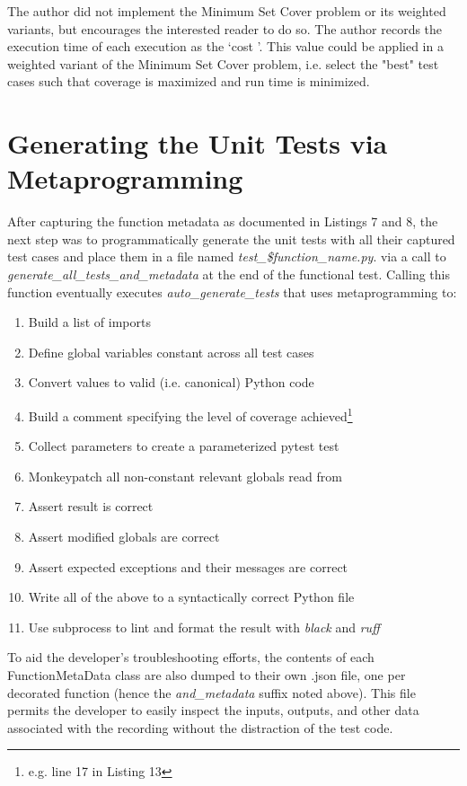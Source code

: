 The author did not implement 
the Minimum Set Cover problem or its weighted variants, but encourages 
the interested reader to do so.  The author records the execution time of each 
execution as the \lq cost \rq. This value could be applied in a weighted 
variant of the Minimum Set Cover problem, i.e. select the "best" test cases
such that coverage is maximized and run time is minimized.

\section{Generating the Unit Tests via Metaprogramming}\label{sec:generating-tests}

After capturing the function metadata as documented in Listings 7 and 8, 
the next step was to programmatically generate the unit tests with all their 
captured test cases and place them in a file named 
\textit{test\_\$function\_name.py}. 
via a call to \textit{generate\_all\_tests\_and\_metadata} at the end of 
the functional test.
Calling this function eventually executes \textit{auto\_generate\_tests} 
that uses metaprogramming to:
\begin{enumerate}
  \item Build a list of imports
  \item Define global variables constant across all test cases
  \item Convert values to valid (i.e. canonical) Python code
  \item Build a comment specifying the level of coverage achieved\footnote{e.g. line 17 in Listing 13}
  \item Collect parameters to create a parameterized pytest test
  \item Monkeypatch all non-constant relevant globals read from
  \item Assert result is correct
  \item Assert modified globals are correct
  \item Assert expected exceptions and their messages are correct
  \item Write all of the above to a syntactically correct Python file
  \item Use subprocess to lint and format the result with \textit{black} and \textit{ruff}
\end{enumerate}

To aid the developer's troubleshooting efforts, the contents of each FunctionMetaData
class are also dumped to their own .json file, one per decorated function (hence
the \textit{and\_metadata} suffix noted above).  This file permits the 
developer to easily inspect the inputs, outputs, and other data
associated with the recording without the distraction of the test code.

